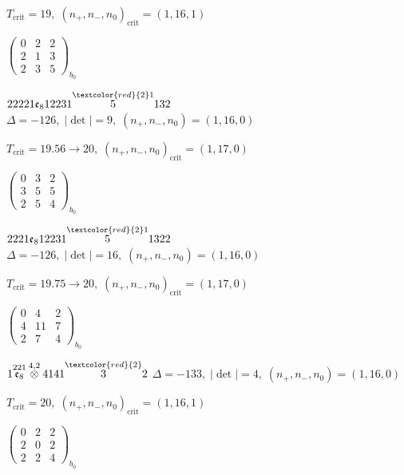 \documentclass[10pt]{article}
\begin{document}
\hspace{1em}$T_{\text{crit}}=19,\; (n_+,n_-,n_0)_{\text{crit}}=(1,16,1)$

\hspace{2em}$\left(\begin{smallmatrix}0 & 2 & 2 \\ 2 & 1 & 3 \\ 2 & 3 & 5\end{smallmatrix}\right)_{\!b_0}$

\smallskip

$22221\mathfrak{e}_812231\overset{\textcolor{red}{2}1}{5}132$ \quad $\Delta=-126,\; |\det|=9,\; (n_+,n_-,n_0)=(1,16,0)$

\hspace{1em}$T_{\text{crit}}=19.56 \to 20,\; (n_+,n_-,n_0)_{\text{crit}}=(1,17,0)$

\hspace{2em}$\left(\begin{smallmatrix}0 & 3 & 2 \\ 3 & 5 & 5 \\ 2 & 5 & 4\end{smallmatrix}\right)_{\!b_0}$

\smallskip

$2221\mathfrak{e}_812231\overset{\textcolor{red}{2}1}{5}1322$ \quad $\Delta=-126,\; |\det|=16,\; (n_+,n_-,n_0)=(1,16,0)$

\hspace{1em}$T_{\text{crit}}=19.75 \to 20,\; (n_+,n_-,n_0)_{\text{crit}}=(1,17,0)$

\hspace{2em}$\left(\begin{smallmatrix}0 & 4 & 2 \\ 4 & 11 & 7 \\ 2 & 7 & 4\end{smallmatrix}\right)_{\!b_0}$

\smallskip

$1\overset{221}{\mathfrak{e}_8}\overset{4,2}{\otimes}4141\overset{\textcolor{red}{2}}{3}2$ \quad $\Delta=-133,\; |\det|=4,\; (n_+,n_-,n_0)=(1,16,0)$

\hspace{1em}$T_{\text{crit}}=20,\; (n_+,n_-,n_0)_{\text{crit}}=(1,16,1)$

\hspace{2em}$\left(\begin{smallmatrix}0 & 2 & 2 \\ 2 & 0 & 2 \\ 2 & 2 & 4\end{smallmatrix}\right)_{\!b_0}$
\end{document}
